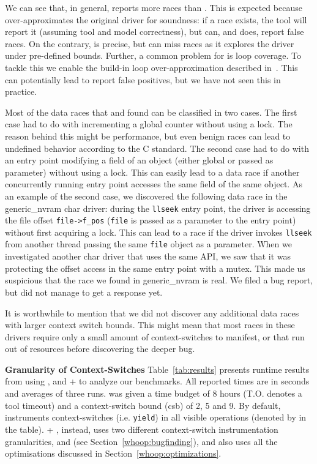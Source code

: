We can see that, in general, \whoop reports more races than \corral. This is expected because \whoop over-approximates the original driver for soundness: if a race exists, the tool will report it (assuming tool and model correctness), but \whoop can, and does, report false races. On the contrary, \corral is precise, but can miss races as it explores the driver under pre-defined bounds. Further, a common problem for \corral is loop coverage. To tackle this we enable the build-in loop over-approximation described in~\cite{lal2014powering}. This can potentially lead \corral to report false positives, but we have not seen this in practice.

Most of the data races that \whoop and \corral found can be classified in two cases. The first case had to do with incrementing a global counter without using a lock. The reason behind this might be performance, but even benign races can lead to undefined behavior according to the C standard. The second case had to do with an entry point modifying a field of an object (either global or passed as parameter) without using a lock. This can easily lead to a data race if another concurrently running entry point accesses the same field of the same object. As an example of the second case, we discovered the following data race in the generic\_nvram char driver: during the \texttt{llseek} entry point, the driver is accessing the file offset \texttt{file->f\_pos} (\texttt{file} is passed as a parameter to the entry point) without first acquiring a lock. This can lead to a race if the driver invokes \texttt{llseek} from another thread passing the same \texttt{file} object as a parameter. When we investigated another char driver that uses the same API, we saw that it was protecting the offset access in the same entry point with a mutex. This made us suspicious that the race we found in generic\_nvram is real. We filed a bug report, but did not manage to get a response yet.

It is worthwhile to mention that we did not discover any additional data races with larger context switch bounds. This might mean that most races in these drivers require only a small amount of context-switches to manifest, or that \corral run out of resources before discovering the deeper bug.

\noindent
\textbf{Granularity of Context-Switches}\xspace\xspace Table~\ref{tab:results} presents runtime results from using \whoop, \corral and \whoop + \corral to analyze our benchmarks. All reported times are in seconds and averages of three runs. \corral was given a time budget of 8 hours (T.O. denotes a tool timeout) and a context-switch bound (csb) of 2, 5 and 9. By default, \corral instruments context-switches (i.e. \texttt{yield}) in all visible operations (denoted by \yieldall in the table). \whoop + \corral, instead, uses two different context-switch instrumentation granularities, \yieldcoarse and \yieldmr (see Section~\ref{whoop:bugfinding}), and also uses all the optimisations discussed in Section~\ref{whoop:optimizations}.

